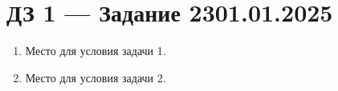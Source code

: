 \documentclass[a4paper]{article}
\def\SheetTitle{ДЗ 1 — Задание 23}
\def\SheetDate{01.01.2025}
\begin{document}
\Large
\section*{\SheetTitle \hfill \normalsize\SheetDate}

\bigskip


\begin{enumerate}[label=\textbf{Задача \arabic*.}, leftmargin=*, itemsep=6mm]

  \item %
  Место для условия задачи 1.

  \item %
  Место для условия задачи 2.

\end{enumerate}
\end{document}
